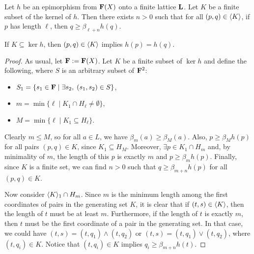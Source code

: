 \begin{lemma}
Let $h$ be an epimorphism from $\mathbf{F}(X)$ onto a finite lattice $\mathbf{L}$.
Let $K$ be a finite subset of the kernel of $h$.
Then there exists $n>0$ such that for all $(p,q) \in \langle K\rangle$, if $p$ has length 
$\ell$, then $q \geq \beta_{\ell+n}h(q)$.
\end{lemma}
\begin{remark}
If $K \subseteq \ker h$, then $(p,q) \in \langle K\rangle$ implies $h(p) = h(q)$. 
\end{remark}
  
\begin{proof}
As usual, let $\mathbf{F} := \mathbf{F}(X)$. Let $K$ be a finite subset of $\ker h$ and
define the following, where $S$ is an arbitrary subset of $\mathbf{F}^2$:
 \begin{itemize}
\item   
  $S_1 = \{s_1 \in \mathbf{F} \mid \exists s_2, \; (s_1,s_2) \in S \}$,
\item   $m = \min \{\ell \mid K_1 \cap H_\ell \neq \emptyset\}$,
\item $M = \min \{\ell \mid K_1 \subseteq H_\ell\}$.
\end{itemize}
Clearly $m\leq M$, so for all $a\in L$, we have $\beta_m(a) \geq \beta_M(a)$. 
Also, $p\geq \beta_M h(p)$ for all pairs $(p, q)\in K$, since $K_1 \subseteq H_M$.
Moreover, $\exists p \in K_1 \cap H_m$ and, by minimality of $m$, the length of 
this $p$ is exactly $m$ and $p \geq \beta_{m} h(p)$.
Finally, since $K$ is a finite set, we can find $n>0$ such that 
$q \geq \beta_{m+n} h(p)$ for all $(p, q) \in K$.

Now consider $\langle K\rangle_1 \cap H_m$.  Since $m$ is the minimum length among the first coordinates
of pairs in the generating set $K$, 
it is clear that if $(t,s) \in \langle K\rangle$, then the length of $t$ must be at least $m$.
Furthermore, if the length of $t$ is exactly $m$, then $t$ must be 
the first coordinate of a pair in the generating set.
In that case, we could have $(t,s) = (t, q_1) \wedge (t, q_2)$
or $(t,s) = (t, q_1) \vee (t, q_2)$, where $(t, q_i) \in K$.
Notice that $(t, q_i) \in K$ implies $q_i \geq \beta_{m+n}h(t)$.


\end{proof}
